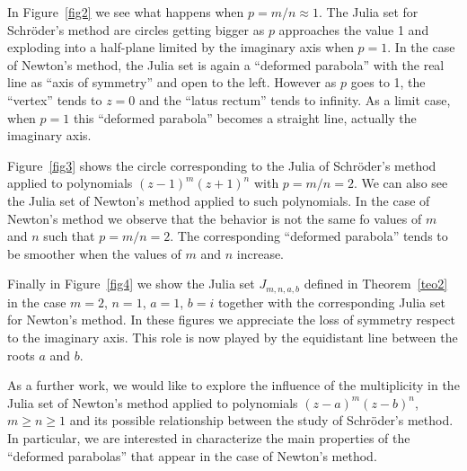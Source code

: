 \documentclass[10pt,a4paper]{article}
\begin{document}
In Figure~\ref{fig2} we see what happens when $p=m/n\approx 1$. The Julia set for Schr\"oder's method are circles getting bigger as $p$ approaches the value 1 and exploding into a half-plane limited by the imaginary axis when $p=1$. In the case of Newton's method, the Julia set is again a ``deformed parabola'' with  the real line as   ``axis of symmetry''  and open to the left. However as $p$ goes to 1, the ``vertex'' tends to  $z=0$ and the ``latus rectum''  tends to infinity. As a limit case, when $p=1$ this ``deformed parabola'' becomes a straight line, actually the imaginary axis.


Figure~\ref{fig3} shows the circle corresponding to the Julia of Schr\"oder's method applied to polynomials $(z-1)^m(z+1)^n$ with $p=m/n=2$. We can also see the Julia set of Newton's method applied to such polynomials. In the case of Newton's method we observe that the behavior is not the same fo values of $m$ and $n$ such that $p=m/n=2$. The corresponding ``deformed parabola'' tends to be smoother when the values of $m$ and $n$ increase.

Finally in Figure~\ref{fig4} we show the Julia set $J_{m,n,a,b}$ defined in Theorem~\ref{teo2} in the case $m=2$, $n=1$, $a=1$, $b=i$ together with the corresponding Julia set for Newton's method. In these figures we appreciate the loss of symmetry respect to the imaginary axis. This role is now played by the equidistant line between the roots $a$ and $b$.

As a further work, we would like to explore the  influence of the multiplicity in the Julia set of Newton's method applied to polynomials $(z-a)^m(z-b)^n$, $m\ge n\ge 1$ and its possible relationship between the study of Schr\"oder's method. In particular, we are interested in characterize the main properties of the ``deformed parabolas'' that appear in the case of Newton's method.
\end{document}
